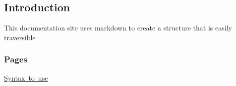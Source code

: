 \subsection*{Introduction}

This documentation site uses markdown to create a structure that is easily traversible

\subsubsection*{Pages}


\begin{DoxyItemize}
\item \mbox{\hyperlink{correctSyntaxPage}{Syntax to use}} 
\end{DoxyItemize}